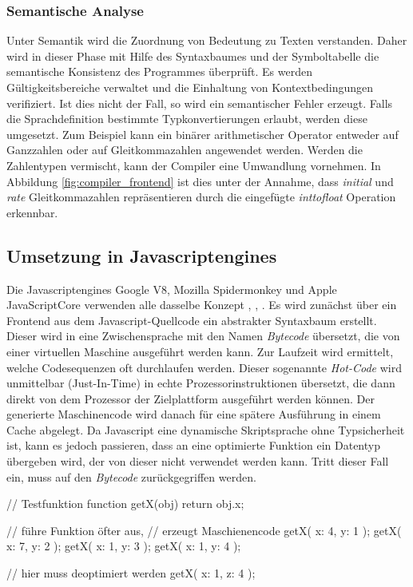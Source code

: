 \subsubsection{Semantische Analyse}

Unter Semantik wird die Zuordnung von Bedeutung zu Texten verstanden. Daher wird in dieser Phase mit Hilfe des Syntaxbaumes und der
Symboltabelle die semantische Konsistenz des Programmes überprüft. Es werden Gültigkeitsbereiche verwaltet und die
Einhaltung von Kontextbedingungen verifiziert. Ist dies nicht der Fall, so wird ein semantischer Fehler erzeugt.
Falls die Sprachdefinition bestimmte Typkonvertierungen erlaubt, werden diese umgesetzt. Zum Beispiel kann ein binärer arithmetischer Operator 
entweder auf Ganzzahlen oder auf Gleitkommazahlen angewendet werden. Werden die Zahlentypen vermischt, kann der Compiler eine Umwandlung vornehmen.
In Abbildung \ref{fig:compiler_frontend} ist dies unter der Annahme, dass \textit{initial} und \textit{rate} Gleitkommazahlen repräsentieren
durch die eingefügte \textit{inttofloat} Operation erkennbar. 

\subsection{Umsetzung in Javascriptengines}

Die Javascriptengines Google V8, Mozilla Spidermonkey und Apple JavaScriptCore verwenden alle dasselbe Konzept \cite{jsSpiderMonkey}, \cite{jsCore}, \cite{v8ByteCode}.
Es wird zunächst über ein Frontend aus dem Javascript-Quellcode ein abstrakter Syntaxbaum erstellt. Dieser wird in eine Zwischensprache
mit den Namen \textit{Bytecode} übersetzt, die von einer virtuellen Maschine ausgeführt werden kann. Zur Laufzeit wird ermittelt, welche
Codesequenzen oft durchlaufen werden. Dieser sogenannte \textit{Hot-Code} wird unmittelbar (Just-In-Time) in echte Prozessorinstruktionen übersetzt, die dann direkt 
von dem Prozessor der Zielplattform ausgeführt werden können. Der generierte Maschinencode wird danach für eine spätere Ausführung in einem Cache abgelegt. 
Da Javascript eine dynamische Skriptsprache ohne Typsicherheit ist, kann es jedoch passieren, dass an eine optimierte Funktion ein 
Datentyp übergeben wird, der von dieser nicht verwendet werden kann. Tritt dieser Fall ein, muss auf den \textit{Bytecode} zurückgegriffen werden.

\begin{program}[h]
	\caption{Deoptimierung in Javascript.}
	\label{prog:js_deopt}
	\begin{JsCode}
// Testfunktion
function getX(obj) {
	return obj.x;
}

// führe Funktion öfter aus,
// erzeugt Maschienencode
getX({ x: 4, y: 1 });
getX({ x: 7, y: 2 });
getX({ x: 1, y: 3 });
getX({ x: 1, y: 4 });

// hier muss deoptimiert werden
getX({ x: 1, z: 4 });\end{JsCode}
\end{program}

